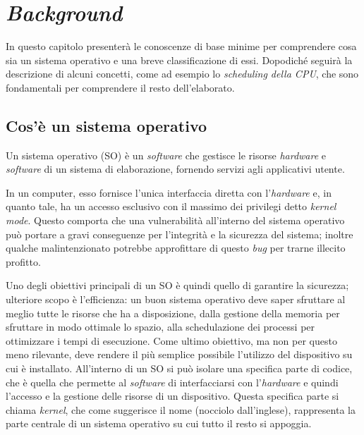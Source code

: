 \chapter{\textit{\uppercase{b}ackground}}
In questo capitolo presenterà le conoscenze di base minime per comprendere cosa sia un sistema operativo e una breve classificazione di essi. Dopodiché seguirà la descrizione di alcuni concetti, come ad esempio lo \textit{scheduling della CPU}, che sono fondamentali per comprendere il resto dell'elaborato.

\section{Cos'è un sistema operativo}
Un sistema operativo (SO) è un \textit{software} che gestisce le risorse \textit{hardware} e \textit{software} di un sistema di elaborazione, fornendo servizi agli applicativi utente.

In un computer, esso fornisce l'unica interfaccia diretta con l'\textit{hardware} e, in quanto tale, ha un accesso esclusivo con il massimo dei privilegi detto \textit{kernel mode}. Questo comporta che una vulnerabilità all'interno del sistema operativo può portare a gravi conseguenze per l'integrità e la sicurezza del sistema; inoltre qualche malintenzionato potrebbe approfittare di questo \textit{bug} per trarne illecito profitto.

Uno degli obiettivi principali di un SO è quindi quello di garantire la sicurezza; ulteriore scopo è l'efficienza: un buon sistema operativo deve saper sfruttare al meglio tutte le risorse che ha a disposizione, dalla gestione della memoria per sfruttare in modo ottimale lo spazio, alla schedulazione dei processi per ottimizzare i tempi di esecuzione. Come ultimo obiettivo, ma non per questo meno rilevante, deve rendere il più semplice possibile l'utilizzo del dispositivo su cui è installato.
All'interno di un SO si può isolare una specifica parte di codice, che è quella che permette al \textit{software} di interfacciarsi con l'\textit{hardware} e quindi l'accesso e la gestione delle risorse di un dispositivo. Questa specifica parte si chiama \textit{kernel}, che come suggerisce il nome (nocciolo dall'inglese), rappresenta la parte centrale di un sistema operativo su cui tutto il resto si appoggia.
\newpage

